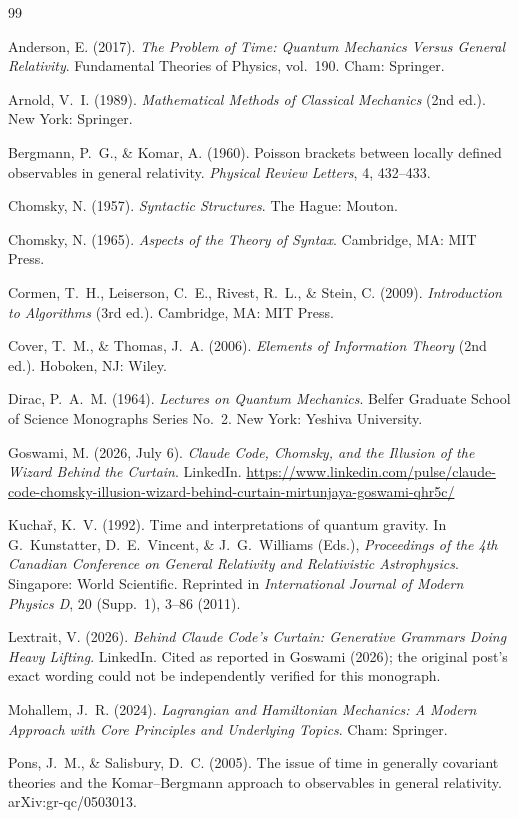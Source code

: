 \documentclass[11pt]{book}
\theoremstyle{plain}
\theoremstyle{definition}
\theoremstyle{remark}
\begin{document}
\backmatter
\cleardoublepage
{}
\begin{thebibliography}{99}

Anderson, E. (2017). \emph{The Problem of Time: Quantum Mechanics
Versus General Relativity}. Fundamental Theories of Physics, vol.\
190. Cham: Springer.

Arnold, V.\ I. (1989). \emph{Mathematical Methods of Classical
Mechanics} (2nd ed.). New York: Springer.

Bergmann, P.\ G., \& Komar, A. (1960). Poisson brackets between
locally defined observables in general relativity. \emph{Physical
Review Letters}, 4, 432--433.

Chomsky, N. (1957). \emph{Syntactic Structures}. The Hague: Mouton.

Chomsky, N. (1965). \emph{Aspects of the Theory of Syntax}.
Cambridge, MA: MIT Press.

Cormen, T.\ H., Leiserson, C.\ E., Rivest, R.\ L., \& Stein, C.
(2009). \emph{Introduction to Algorithms} (3rd ed.). Cambridge, MA:
MIT Press.

Cover, T.\ M., \& Thomas, J.\ A. (2006). \emph{Elements of
Information Theory} (2nd ed.). Hoboken, NJ: Wiley.

Dirac, P.\ A.\ M. (1964). \emph{Lectures on Quantum Mechanics}.
Belfer Graduate School of Science Monographs Series No.\ 2. New York:
Yeshiva University.

Goswami, M. (2026, July 6). \emph{Claude Code, Chomsky, and the
Illusion of the Wizard Behind the Curtain}. LinkedIn.
\url{https://www.linkedin.com/pulse/claude-code-chomsky-illusion-wizard-behind-curtain-mirtunjaya-goswami-qhr5c/}

Kucha\v{r}, K.\ V. (1992). Time and interpretations of quantum
gravity. In G.\ Kunstatter, D.\ E.\ Vincent, \& J.\ G.\ Williams
(Eds.), \emph{Proceedings of the 4th Canadian Conference on General
Relativity and Relativistic Astrophysics}. Singapore: World
Scientific. Reprinted in \emph{International Journal of Modern
Physics D}, 20 (Supp.\ 1), 3--86 (2011).

Lextrait, V. (2026). \emph{Behind Claude Code's Curtain: Generative
Grammars Doing Heavy Lifting}. LinkedIn. Cited as reported in
Goswami (2026); the original post's exact wording could not be
independently verified for this monograph.

Mohallem, J.\ R. (2024). \emph{Lagrangian and Hamiltonian Mechanics:
A Modern Approach with Core Principles and Underlying Topics}. Cham:
Springer.

Pons, J.\ M., \& Salisbury, D.\ C. (2005). The issue of time in
generally covariant theories and the Komar--Bergmann approach to
observables in general relativity. arXiv:gr-qc/0503013.

\end{thebibliography}
\end{document}
